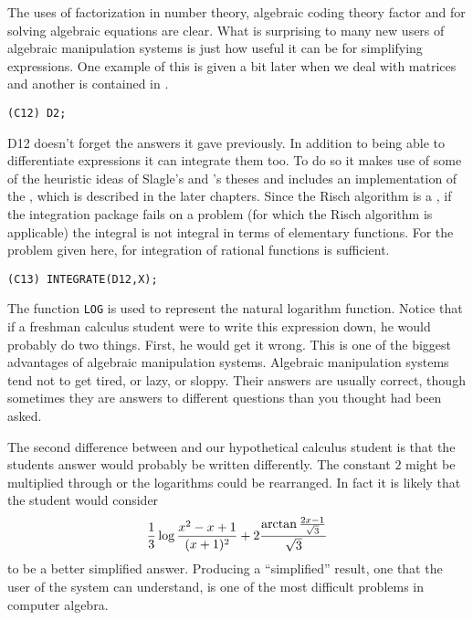 The uses of factorization in number theory, algebraic coding theory
factor and for solving algebraic equations are clear.  What is
surprising to many new users of algebraic manipulation systems is just
how useful it can be for simplifying expressions.  One example of this
is given a bit later when we deal with matrices and another is
contained in .
\begin{verbatim}
(C12) D2;
\end{verbatim}
 {D12} 
{\Macsyma} doesn't forget the answers it gave previously.  In addition
to being able to differentiate expressions it can integrate them too.
To do so it makes use of some of the heuristic ideas of Slagle's and
{\MosesJ}'s theses \cite{Slagle:Thesis,Moses68} and includes an
implementation of the , which is described in
the later chapters.  Since the Risch algorithm is a , if the integration package fails on a problem (for which
the Risch algorithm is applicable) the integral is not integral in
terms of elementary functions.  For the problem given here,
 for integration of rational functions is
sufficient.
\begin{verbatim}
(C13) INTEGRATE(D12,X);
\end{verbatim}
The function {\tt LOG} is used to represent the natural logarithm function.
Notice that if a freshman calculus student were to write this expression
down, he would probably do two things.  First, he would get it wrong.  This
is one of the biggest advantages of algebraic manipulation systems.
Algebraic manipulation systems tend not to get tired, or lazy, or
sloppy.  Their answers are usually correct, though sometimes they are
answers to different questions than you thought had been asked.

The second difference between {\Macsyma} and our hypothetical calculus
student is that the students answer would probably be written differently.
The constant $2$ might be multiplied through or the logarithms could be
rearranged.  In fact it is likely that the student would consider 
\[
{1 \over 3} \log {x^2 - x + 1 \over (x+1)^2} 
+ 2 {\arctan {2 x - 1 \over \sqrt{3}} \over \sqrt{3}}
\]
to be a better simplified answer.  Producing a ``simplified'' result, one
that the user of the system can understand, is one of the most difficult
problems in computer algebra.  

